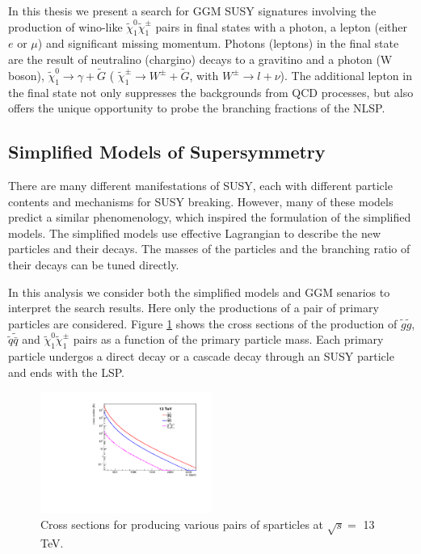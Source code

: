 \documentclass[thesis.tex]{subfiles}
\begin{document}
In this thesis we present a search for GGM SUSY signatures involving the production of wino-like $\tilde{\chi}_1^0\tilde{\chi}_1^\pm$ pairs in final states with a photon, a lepton (either $e$ or $\mu$) and significant missing momentum. 
Photons (leptons) in the final state are the result of neutralino (chargino) decays to a gravitino and a photon (W boson), $\tilde{\chi}_1^0 \rightarrow \gamma + \tilde{G}$ ( $\tilde{\chi}_1^\pm \rightarrow W^\pm+ \tilde{G}$, with $W^\pm \rightarrow l + \nu$).
The additional lepton in the final state not only suppresses the backgrounds from QCD processes, but also offers the unique opportunity to probe the branching fractions of the NLSP.  

\subsection{Simplified Models of Supersymmetry}

There are many different manifestations of SUSY, each with different particle contents and mechanisms for SUSY breaking. 
However, many of these models predict a similar phenomenology, which inspired the formulation of the simplified models.
The simplified models use effective Lagrangian to describe the new particles and their decays. 
The masses of the particles and the branching ratio of their decays can be tuned directly. 

In this analysis we consider both the simplified models and GGM senarios to interpret the search results. 
Here only the productions of a pair of primary particles are considered. 
Figure \ref{fig:crosssection} shows the cross sections of the production of $\tilde{g}\tilde{g}$, $\tilde{q}\tilde{\bar{q}}$ and $\tilde{\chi}_1^0\tilde{\chi}_1^\pm$ pairs as a function of the primary particle mass. 
Each primary particle undergos a direct decay or a cascade decay through an SUSY particle and ends with the LSP. 

	\begin{figure}[!h]
		\centering
		\includegraphics[width=0.5\textwidth]{plot/xs_thesis.pdf}
		\caption{Cross sections for producing various pairs of sparticles at $\sqrt{s} =$ 13 TeV.} 
		\label{fig:crosssection}
	\end{figure}
\end{document}
